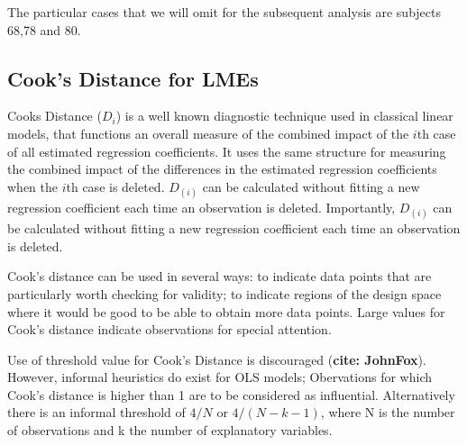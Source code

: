 \documentclass[12pt, a4paper]{report}
\theoremstyle{plain}
\theoremstyle{definition}
\theoremstyle{remark}
\begin{document}
%
%
%

The particular cases that we will omit for the subsequent analysis are subjects 68,78 and 80.

\subsection{Cook's Distance for LMEs} %



 Cooks Distance ($D_{i}$) is a well known diagnostic technique used in classical linear models, that functions an overall measure of the combined impact of the $i$th case of all estimated regression coefficients. It uses the same structure for measuring the combined impact of the differences in the estimated regression coefficients when the $i$th case is deleted. $D_{(i)}$ can be calculated without fitting a new regression coefficient each time an observation is deleted. Importantly, $D_{(i)}$ can be calculated without fitting a new regression coefficient each time an observation is deleted.


Cook's distance can be used in several ways: to indicate data points that are particularly worth checking for validity; to indicate regions of the design space where it would be good to be able to obtain more data points. 
Large values for Cook's distance indicate observations for special attention. 

Use of threshold value for Cook's Distance is discouraged (\textbf{cite: JohnFox}). However, informal heuristics do exist for OLS models; Obervations for which Cook's distance is higher than 1 are to be considered as influential. Alternatively there is an informal threshold of $4/N$ or $4/(N−k−1)$, where N is the number of observations and k the number of explanatory variables.


\end{document}
